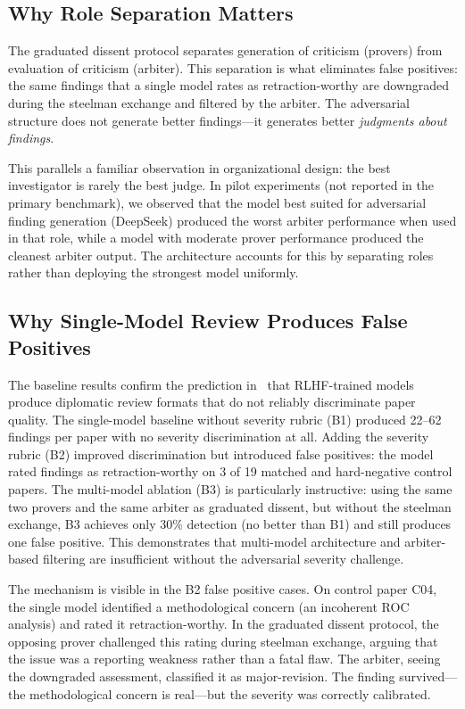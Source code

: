 \documentclass[11pt]{article}
\begin{document}
\subsection{Why Role Separation Matters}

The graduated dissent protocol separates generation of criticism (provers) from evaluation of criticism (arbiter). This separation is what eliminates false positives: the same findings that a single model rates as retraction-worthy are downgraded during the steelman exchange and filtered by the arbiter. The adversarial structure does not generate better findings---it generates better \emph{judgments about findings}.

This parallels a familiar observation in organizational design: the best investigator is rarely the best judge. In pilot experiments (not reported in the primary benchmark), we observed that the model best suited for adversarial finding generation (DeepSeek) produced the worst arbiter performance when used in that role, while a model with moderate prover performance produced the cleanest arbiter output. The architecture accounts for this by separating roles rather than deploying the strongest model uniformly.

\subsection{Why Single-Model Review Produces False Positives}

The baseline results confirm the prediction in~\cite{brilliant2026selfcorrection} that RLHF-trained models produce diplomatic review formats that do not reliably discriminate paper quality. The single-model baseline without severity rubric (B1) produced 22--62 findings per paper with no severity discrimination at all. Adding the severity rubric (B2) improved discrimination but introduced false positives: the model rated findings as retraction-worthy on 3 of 19 matched and hard-negative control papers. The multi-model ablation (B3) is particularly instructive: using the same two provers and the same arbiter as graduated dissent, but without the steelman exchange, B3 achieves only 30\% detection (no better than B1) and still produces one false positive. This demonstrates that multi-model architecture and arbiter-based filtering are insufficient without the adversarial severity challenge.

The mechanism is visible in the B2 false positive cases. On control paper C04, the single model identified a methodological concern (an incoherent ROC analysis) and rated it retraction-worthy. In the graduated dissent protocol, the opposing prover challenged this rating during steelman exchange, arguing that the issue was a reporting weakness rather than a fatal flaw. The arbiter, seeing the downgraded assessment, classified it as major-revision. The finding survived---the methodological concern is real---but the severity was correctly calibrated.
\end{document}
